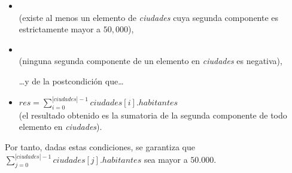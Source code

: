 \documentclass[10pt,a4paper]{article}
\begin{document}
\begin{itemize}
    \item{ \\
          (existe al menos un elemento de \textit{ciudades} cuya segunda componente es estrictamente mayor a $50,000$),}
    \item{ \\
          (ninguna segunda componente de un elemento en \textit{ciudades} es negativa),}

\ldots y de la postcondición que\ldots

    \item{$res = \sum\limits_{i = 0}^{|ciudades| - 1} ciudades[i].habitantes$ \\
          (el resultado obtenido es la sumatoria de la segunda componente de todo elemento en \textit{ciudades}).}
\end{itemize}

Por tanto, dadas estas condiciones, se garantiza que $\sum\limits_{j = 0}^{|ciudades| - 1} ciudades[j].habitantes$ sea mayor a $50.000$.
\end{document}
